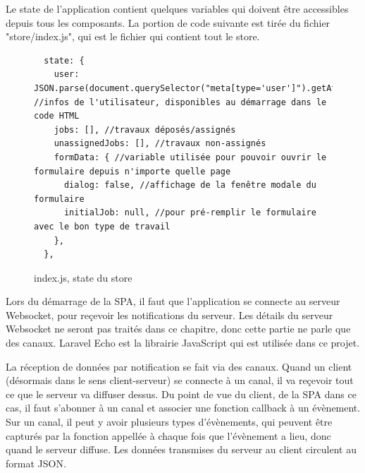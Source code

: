 \documentclass[
    iai, %
    eai, %
]{heig-tb}
\begin{document}
\newpage
Le state de l'application contient quelques variables qui doivent être accessibles depuis tous les composants. La portion de code suivante est tirée du fichier "store/index.js", qui est le fichier qui contient tout le store.

\begin{figure}[h]
  \begin{verbatim}
  state: {
    user: JSON.parse(document.querySelector("meta[type='user']").getAttribute("value")), //infos de l'utilisateur, disponibles au démarrage dans le code HTML
    jobs: [], //travaux déposés/assignés
    unassignedJobs: [], //travaux non-assignés
    formData: { //variable utilisée pour pouvoir ouvrir le formulaire depuis n'importe quelle page
      dialog: false, //affichage de la fenêtre modale du formulaire
      initialJob: null, //pour pré-remplir le formulaire avec le bon type de travail
    },
  },
  \end{verbatim}
  \caption{index.js, state du store}
\end{figure}

Lors du démarrage de la SPA, il faut que l'application se connecte au serveur Websocket, pour reçevoir les notifications du serveur.
Les détails du serveur Websocket ne seront pas traités dans ce chapitre, donc cette partie ne parle que des canaux. Laravel Echo est la librairie JavaScript qui est utilisée dans ce projet.

La réception de données par notification se fait via des canaux. Quand un client (désormais dans le sens client-serveur) se connecte à un canal, il va reçevoir tout ce que le serveur va diffuser dessus. Du point de vue du client, de la SPA dans ce cas, il faut s'abonner à un canal et associer une fonction callback à un évènement. Sur un canal, il peut y avoir plusieurs types d'évènements, qui peuvent être capturés par la fonction appellée à chaque fois que l'évènement a lieu, donc quand le serveur diffuse. Les données transmises du serveur au client circulent au format JSON.
\end{document}
